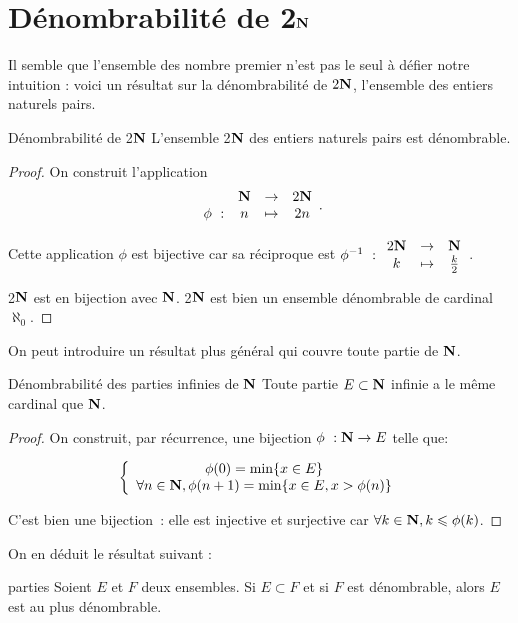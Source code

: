 \documentclass[a4paper,french,final]{memoir}
\begin{document}
\section{\texorpdfstring{Dénombrabilité de 2$\mathbf{N}$}{Dénombrabilité de 2N}}
\label{sec:denombrabilite_usuelle}
Il semble que l'ensemble des nombre premier n'est pas le seul à défier notre intuition :  voici un résultat sur la dénombrabilité de  $2\mathbf{N}$, l'ensemble des entiers naturels pairs.

\begin{theoremb}{Dénombrabilité de 2$\mathbf{N}$}{}
	L'ensemble 2$\mathbf{N}$ des entiers naturels pairs est dénombrable. 
\end{theoremb}

\begin{proof}
	On construit l'application \[ \begin{array}{cccc}
	\ & \NN& \to& 2\NN \\
	\phi~: & n & \mapsto & 2n
	\end{array}.\]
	
	Cette application $\phi $ est bijective car sa réciproque est $ \phi^{-1}~: \begin{array}{ccc}
	2\NN & \to & \NN\\
	k & \mapsto & \frac{k}{2}
	\end{array}$. 
	
	2$\mathbf{N}$ est en bijection avec $\mathbf{N}$. 2$\mathbf{N}$ est bien un ensemble dénombrable de cardinal $\aleph_0$. 
\end{proof}

On peut introduire un résultat plus général qui couvre toute partie de $\mathbf{N}$. 

\begin{theoremb}{Dénombrabilité des parties infinies de $\mathbf{N}$}{}
	Toute partie $E \subset \mathbf{N}$ infinie a le même cardinal que $\mathbf{N}$. 
\end{theoremb}

\begin{proof}
	On construit, par récurrence, une bijection $\phi~: \NN \to E$ telle que: 
	
	\[\left\lbrace \begin{array}{c}
	\phi(0) = \min \{x \in E\} \\
	\forall n \in \NN, \phi(n+1) = \min \{x \in E, x > \phi(n) \}
	\end{array} \right.\]
	
	C'est bien une bijection~: elle est injective et surjective car $\forall k \in \NN, k \leq \phi(k)$. 
\end{proof}
On en déduit le résultat suivant : 
\begin{theoremb}{}{parties}
	Soient $E$ et $F$ deux ensembles. 
	Si $E \subset F$ et si $F$ est dénombrable, alors $E$ est au plus dénombrable.
\end{theoremb}
\end{document}
